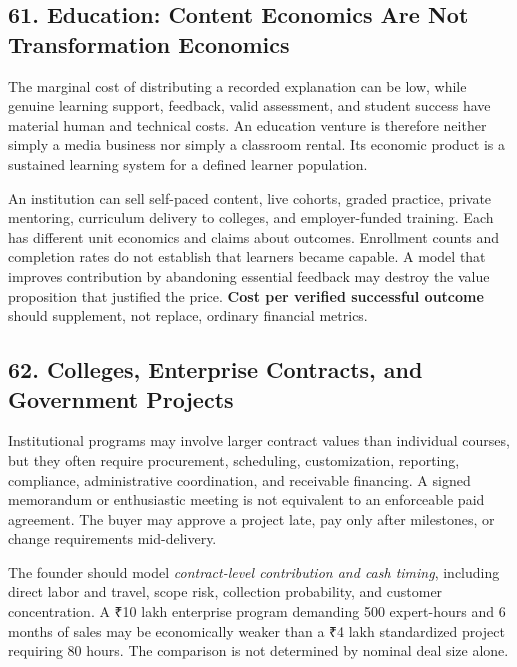 \subsection*{61. Education: Content Economics Are Not Transformation Economics}

The marginal cost of distributing a recorded explanation can be low, while genuine learning support, feedback, valid assessment, and student success have material human and technical costs. An education venture is therefore neither simply a media business nor simply a classroom rental. Its economic product is a sustained learning system for a defined learner population.

An institution can sell self-paced content, live cohorts, graded practice, private mentoring, curriculum delivery to colleges, and employer-funded training. Each has different unit economics and claims about outcomes. Enrollment counts and completion rates do not establish that learners became capable. A model that improves contribution by abandoning essential feedback may destroy the value proposition that justified the price. \textbf{Cost per verified successful outcome} should supplement, not replace, ordinary financial metrics.

\subsection*{62. Colleges, Enterprise Contracts, and Government Projects}

Institutional programs may involve larger contract values than individual courses, but they often require procurement, scheduling, customization, reporting, compliance, administrative coordination, and receivable financing. A signed memorandum or enthusiastic meeting is not equivalent to an enforceable paid agreement. The buyer may approve a project late, pay only after milestones, or change requirements mid-delivery.

The founder should model \emph{contract-level contribution and cash timing}, including direct labor and travel, scope risk, collection probability, and customer concentration. A ₹10 lakh enterprise program demanding 500 expert-hours and 6 months of sales may be economically weaker than a ₹4 lakh standardized project requiring 80 hours. The comparison is not determined by nominal deal size alone.
